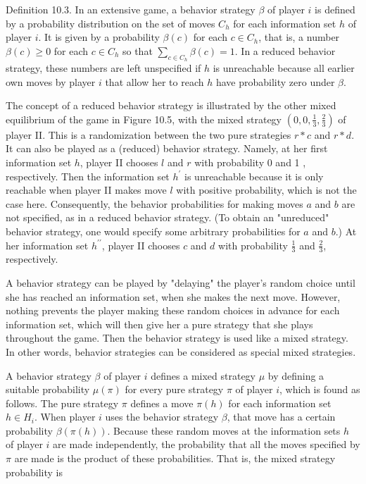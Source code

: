 \documentclass[12pt]{article}
\begin{document}
Definition 10.3. In an extensive game, a behavior strategy $\beta$ of player $i$ is defined by a probability distribution on the set of moves $C_{h}$ for each information set $h$ of player $i$. It is given by a probability $\beta(c)$ for each $c \in C_{h}$, that is, a number $\beta(c) \geq 0$ for each $c \in C_{h}$ so that $\sum_{c \in C_{h}} \beta(c)=1$. In a reduced behavior strategy, these numbers are left unspecified if $h$ is unreachable because all earlier own moves by player $i$ that allow her to reach $h$ have probability zero under $\beta$.

The concept of a reduced behavior strategy is illustrated by the other mixed equilibrium of the game in Figure 10.5, with the mixed strategy $\left(0,0, \frac{1}{3}, \frac{2}{3}\right)$ of player II. This is a randomization between the two pure strategies $r * c$ and $r * d$. It can also be played as a (reduced) behavior strategy. Namely, at her first information set $h$, player II chooses $l$ and $r$ with probability 0 and 1 , respectively. Then the information set $h^{\prime}$ is unreachable because it is only reachable when player II makes move $l$ with positive probability, which is not the case here. Consequently, the behavior probabilities for making moves $a$ and $b$ are not specified, as in a reduced behavior strategy. (To obtain an "unreduced" behavior strategy, one would specify some arbitrary probabilities for $a$ and $b$.) At her information set $h^{\prime \prime}$, player II chooses $c$ and $d$ with probability $\frac{1}{3}$ and $\frac{2}{3}$, respectively.

A behavior strategy can be played by "delaying" the player's random choice until she has reached an information set, when she makes the next move. However, nothing prevents the player making these random choices in advance for each information set, which will then give her a pure strategy that she plays throughout the game. Then the behavior strategy is used like a mixed strategy. In other words, behavior strategies can be considered as special mixed strategies.

A behavior strategy $\beta$ of player $i$ defines a mixed strategy $\mu$ by defining a suitable probability $\mu(\pi)$ for every pure strategy $\pi$ of player $i$, which is found as follows. The pure strategy $\pi$ defines a move $\pi(h)$ for each information set $h \in H_{i}$. When player $i$ uses the behavior strategy $\beta$, that move has a certain probability $\beta(\pi(h))$. Because these random moves at the information sets $h$ of player $i$ are made independently, the probability that all the moves specified by $\pi$ are made is the product of these probabilities. That is, the mixed strategy probability is
\end{document}
